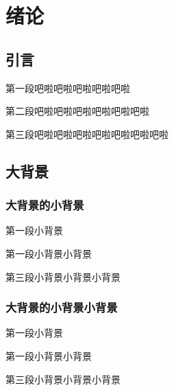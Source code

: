 \chapter{绪论}

\section{引言}

第一段吧啦吧啦吧啦吧啦吧啦

第二段吧啦吧啦吧啦吧啦吧啦吧啦

第三段吧啦吧啦吧啦吧啦吧啦吧啦吧啦

\section{大背景}

\subsection{大背景的小背景}

第一段小背景

第一段小背景小背景

第三段小背景小背景小背景

\subsection{大背景的小背景小背景}

第一段小背景

第一段小背景小背景

第三段小背景小背景小背景
